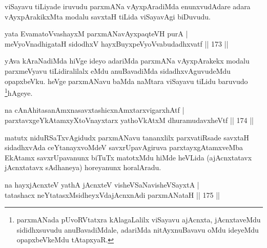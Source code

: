 \begin{artha}
viSayavu tiLiyade iruvudu parxmANa vAyxpAradiMda enunxvudAdare adara vAyxpArakikxMta modalu savxtaH tiLida viSayavAgi biDuvudu.
\end{artha}

\begin{shl}
yata EvamatoV\s vashayxM parxmANavAyxpaqteVH purA | \\
meVyoV\s nadhigataH sidodhxV hayxBuyxpeVyoV\s vabudadhxvatf \hfill||  173 ||  
\end{shl}

\begin{artha}
yAva kAraNadiMda hiVge ideyo adariMda parxmANa vAyxpArakekx modalu parxmeVyavu tiLidiralilalx eMdu anuBavadiMda sidadhxvAguvudeMdu opapxbeVku. heVge parxmANavu baMda naMtara viSayavu tiLidu baruvudo \footnote{parxmANada pUvoRVtatxra kAlagaLalilx viSayavu ajAcnxta, jAcnxtaveMdu sididhxsuvudu anuBavadiMdale, adariMda nitAyxnuBavavu oMdu ideyeMdu opapxbeVkeMdu tAtapxyaR.}hAgeye.
\end{artha}


\begin{shl}
na \footnotemark{}cAnAhitasanAmxnasavxtashicxnAmxtarxvigarxhAtf |  \\
parxtavxgeYkAtamxyXtoV\s nayxtarx yathoVkAtxM dhuramudavxheVtf \hfill||  174 ||  
\end{shl}

\begin{artha}
matutx niduRSaTxvAgidudx parxmANavu tananxlilx parxvatiRsade savxtaH sidadhxvAda ceYtanayxvoMdeV savxrUpavAgiruva parxtayxgAtamxveMba EkAtamx savxrUpavanunx biTuTx matotxMdu hiMde heVLida (ajAcnxtatavx jAcnxtatavx sAdhaneya) horeyanunx horalAradu.
\end{artha}

\begin{shl}
na hayxjAcnxteV yathA jAcnxteV visheVSaNavisheVSayxtA | \\
tatashacx neYtatasxMsidheyxVdajAcnxnAdi parxmANataH \hfill||  175 ||  
\end{shl}


